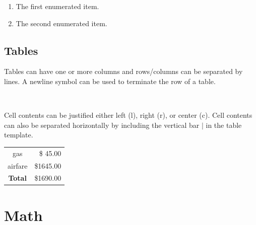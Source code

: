 \documentclass{article}
\begin{document}
\bigskip

\begin{enumerate}
\item The first enumerated item. %
\item The second enumerated item. %
\end{enumerate}


\subsection{Tables}\label{section-tables}

Tables can have one or more columns and rows/columns can be
separated by lines. A newline symbol can be used to terminate the
row of a table.

\bigskip

\begin{center}
 \
\end{center}

\bigskip

Cell contents can be justified either left (l), right (r), or
center (c). Cell contents can also be separated horizontally by
including the vertical bar $|$ in the table template.

\begin{center}
\begin{tabular}{|c|r|}
\hline %
gas            & \$ 45.00  \\ %
airfare        & \$1645.00 \\ \hline %
\textbf{Total} & \$1690.00 \\ \hline %
\end{tabular}
\end{center}

\section{Math}
\end{document}
